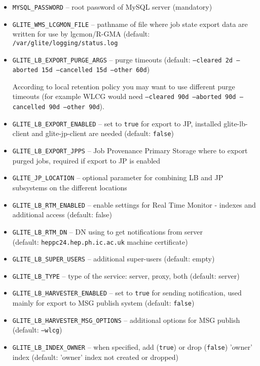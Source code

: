 \begin{itemize}
\item \texttt{MYSQL\_PASSWORD} -- root password of MySQL server (mandatory)
\item \texttt{GLITE\_WMS\_LCGMON\_FILE} -- pathname of file where job state
export data are written for use by lgcmon/R-GMA 
(default: \texttt{/var/glite/logging/status.log}
\item \texttt{GLITE\_LB\_EXPORT\_PURGE\_ARGS} -- purge timeouts (default: \texttt{--cleared 2d --aborted 15d --cancelled 15d --other 60d})

According to local retention policy you may want to use different purge timeouts (for example WLCG would need \texttt{--cleared 90d --aborted 90d --cancelled 90d --other 90d}).
\item \texttt{GLITE\_LB\_EXPORT\_ENABLED} -- set to \texttt{true} for export to JP, installed glite-lb-client and glite-jp-client are needed (default: \texttt{false})
\item \texttt{GLITE\_LB\_EXPORT\_JPPS} -- Job Provenance Primary Storage where to export purged jobs, required if export to JP is enabled
\item \texttt{GLITE\_JP\_LOCATION} -- optional parameter for combining LB and JP subsystems on the different locations
\item \texttt{GLITE\_LB\_RTM\_ENABLED} -- enable settings for Real Time Monitor - indexes and additional access (default: false)
\item \texttt{GLITE\_LB\_RTM\_DN} -- DN using to get notifications from \LB server\\
(default: \texttt{heppc24.hep.ph.ic.ac.uk} machine certificate)
\item \texttt{GLITE\_LB\_SUPER\_USERS} -- additional super-users (default: empty)
\item \texttt{GLITE\_LB\_TYPE} -- type of the \LB service: server, proxy, both (default: server)
\item \texttt{GLITE\_LB\_HARVESTER\_ENABLED} -- set to \texttt{true} for sending notification, used mainly for export to MSG publish system (default: \texttt{false})
\item \texttt{GLITE\_LB\_HARVESTER\_MSG\_OPTIONS} -- additional options for MSG publish (default: \texttt{--wlcg})
\item \texttt{GLITE\_LB\_INDEX\_OWNER} -- when specified, add (\texttt{true}) or drop (\texttt{false}) 'owner' index (default: 'owner' index not created or dropped)
\end{itemize}

